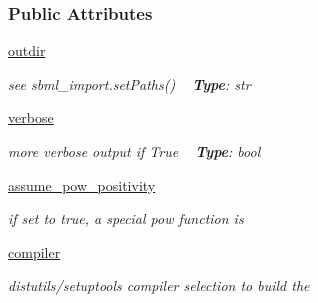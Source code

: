 \subsubsection*{Public Attributes}
\begin{DoxyCompactItemize}
\item 
\mbox{\label{classamici_1_1ode__export_1_1_o_d_e_exporter_aac4f80ee02f9c658ec0633be070b1c1b}} 
\mbox{\hyperlink{classamici_1_1ode__export_1_1_o_d_e_exporter_aac4f80ee02f9c658ec0633be070b1c1b}{outdir}}
\begin{DoxyCompactList}\small\item\em see sbml\+\_\+import.\+set\+Paths() ~\newline
{\bfseries{Type}}\+: str \end{DoxyCompactList}\item 
\mbox{\label{classamici_1_1ode__export_1_1_o_d_e_exporter_aa9e289eddb591991c9bc7321dc5b186b}} 
\mbox{\hyperlink{classamici_1_1ode__export_1_1_o_d_e_exporter_aa9e289eddb591991c9bc7321dc5b186b}{verbose}}
\begin{DoxyCompactList}\small\item\em more verbose output if True ~\newline
{\bfseries{Type}}\+: bool \end{DoxyCompactList}\item 
\mbox{\label{classamici_1_1ode__export_1_1_o_d_e_exporter_a29c4626a170365ee3773218f11565690}} 
\mbox{\hyperlink{classamici_1_1ode__export_1_1_o_d_e_exporter_a29c4626a170365ee3773218f11565690}{assume\+\_\+pow\+\_\+positivity}}
\begin{DoxyCompactList}\small\item\em if set to true, a special pow function is \end{DoxyCompactList}\item 
\mbox{\label{classamici_1_1ode__export_1_1_o_d_e_exporter_a3da8f16c6fe93b3b56fc83d5ceda9ead}} 
\mbox{\hyperlink{classamici_1_1ode__export_1_1_o_d_e_exporter_a3da8f16c6fe93b3b56fc83d5ceda9ead}{compiler}}
\begin{DoxyCompactList}\small\item\em distutils/setuptools compiler selection to build the \end{DoxyCompactList}\item 

\end{DoxyCompactItemize}
